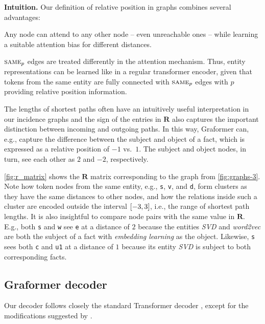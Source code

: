\documentclass[11pt]{article}
\newcommand{\para}[1]{\noindent\textbf{#1.}}
\newcommand{\sameEnt}{\textsc{same}}
\newcommand{\mat}{\bm}  \let\oldvec\vec
\renewcommand{\vec}{\bm}
\begin{document}
\para{Intuition}
Our definition of relative position in graphs combines several advantages:
\begin{enumerate*}[label=(\roman*)]
	\item Any node can attend to any other node -- even
          unreachable ones --
	while learning a suitable attention bias for different distances.
	\item $\sameEnt{}_p$ edges are treated differently in the attention mechanism.
	Thus, entity representations can be learned like in a regular transformer encoder,
	given that tokens from the same entity are fully connected with $\sameEnt{}_p$ edges
	with $p$ providing relative position information.
	\item The lengths of shortest paths
	often have an intuitively useful interpretation in our incidence graphs
	and the sign of the entries in $\mat{R}$ also captures
	the important distinction between incoming and outgoing paths.
	In this way, Graformer can, e.g.,
	capture the difference between the subject and object of a fact,
	which is expressed as a relative position of $-1$ vs.\ $1$.
	The subject and object nodes, in turn, see each other as $2$ and $-2$, respectively.
\end{enumerate*}

\cref{fig:r_matrix} shows the $\mat{R}$ matrix corresponding to the graph from \cref{fig:graphs-3}.
Note how token nodes from the same entity, e.g., \texttt{s}, \texttt{v}, and \texttt{d}, form clusters as they have the same distances to other nodes,
and how the relations inside such a cluster are encoded outside the interval $\interval{-3}{3}$,
i.e., the range of shortest path lengths.
It is also insightful to compare node pairs with the same value in $\mat{R}$.
E.g., both \texttt{s} and \texttt{w} see \texttt{e} at a distance of $2$
because the entities \emph{SVD} and \emph{word2vec} are both the subject of a fact with \emph{embedding learning} as the object.
Likewise, \texttt{s} sees both \texttt{c} and \texttt{u1} at a distance of $1$ because its entity \emph{SVD} is subject to both corresponding facts.


\subsection{Graformer decoder}
\label{sec:decoder}

Our decoder follows closely the standard Transformer decoder \citep{vaswani17},
except for the modifications suggested by \citet{chen-etal-2018-best}.
\end{document}
